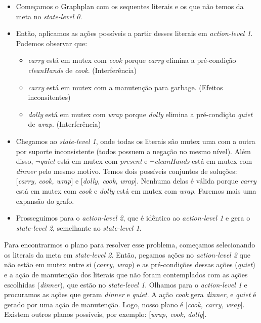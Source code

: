 \documentclass[12pt,letterpaper]{article}
\begin{document}
	\begin{itemize}
		\item Começamos o Graphplan com os sequentes literais e os que não temos da meta no \textit{state-level 0}.
		\item Então, aplicamos as ações possíveis a partir desses literais em \textit{action-level 1}. Podemos observar que:
		\begin{itemize}
			\item \textit{carry} está em mutex com \textit{cook} porque \textit{carry} elimina a pré-condição \textit{cleanHands} de \textit{cook}. (Interferência)
			\item \textit{carry} está em mutex com a manutenção para garbage. (Efeitos inconsitentes)
			\item \textit{dolly} está em mutex com \textit{wrap} porque \textit{dolly} elimina a pré-condição \textit{quiet} de \textit{wrap}. (Interferência)
		\end{itemize}
		\item Chegamos ao \textit{state-level 1}, onde todas os literais são mutex uma com a outra por suporte inconsistente (todos possuem a negação no mesmo nível). Além disso, \textit{$\lnot$quiet} está em mutex com \textit{present} e \textit{$\lnot$cleanHands} está em mutex com \textit{dinner} pelo mesmo motivo. Temos dois possíveis conjuntos de soluções: [\textit{carry, cook, wrap}] e [\textit{dolly, cook, wrap}]. Nenhuma delas é válida porque \textit{carry} está em mutex com \textit{cook} e \textit{dolly} está em mutex com \textit{wrap}. Faremos mais uma expansão do grafo.
		\item Prosseguimos para o \textit{action-level 2}, que é idêntico ao \textit{action-level 1} e gera o \textit{state-level 2}, semelhante ao \textit{state-level 1}.
	\end{itemize}

	Para encontrarmos o plano para resolver esse problema, começamos selecionando os literais da meta em \textit{state-level 2}. Então, pegamos ações no \textit{action-level 2} que não estão em mutex entre si (\textit{carry, wrap}) e as pré-condições dessas ações (\textit{quiet}) e a ação de manutenção dos literais que não foram contemplados com as ações escolhidas (\textit{dinner}), que estão no \textit{state-level 1}. Olhamos para o \textit{action-level 1} e procuramos as ações que geram \textit{dinner} e \textit{quiet}. A ação \textit{cook} gera \textit{dinner}, e \textit{quiet} é gerado por uma ação de manutenção. Logo, nosso plano é [\textit{cook, carry, wrap}]. Existem outros planos possíveis, por exemplo: [\textit{wrap, cook, dolly}].    
\end{document}
